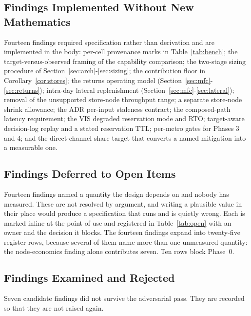 \subsection{Findings Implemented Without New Mathematics}

Fourteen findings required specification rather than derivation and are implemented in the body: per-cell provenance marks in Table~\ref{tab:bench}; the target-versus-observed framing of the capability comparison; the two-stage sizing procedure of Section~\ref{sec:arch}-\ref{sec:sizing}; the contribution floor in Corollary~\ref{cor:stores}; the returns operating model (Section~\ref{sec:mfc}-\ref{sec:returns}); intra-day lateral replenishment (Section~\ref{sec:mfc}-\ref{sec:lateral}); removal of the unsupported store-node throughput range; a separate store-node shrink allowance; the ADR per-input staleness contract; the composed-path latency requirement; the VIS degraded reservation mode and RTO; target-aware decision-log replay and a stated reservation TTL; per-metro gates for Phases 3 and 4; and the direct-channel share target that converts a named mitigation into a measurable one.

\subsection{Findings Deferred to Open Items}

Fourteen findings named a quantity the design depends on and nobody has measured. These are not resolved by argument, and writing a plausible value in their place would produce a specification that runs and is quietly wrong. Each is marked inline at the point of use and registered in Table~\ref{tab:open} with an owner and the decision it blocks. The fourteen findings expand into twenty-five register rows, because several of them name more than one unmeasured quantity: the node-economics finding alone contributes seven. Ten rows block Phase~0.

\subsection{Findings Examined and Rejected}

Seven candidate findings did not survive the adversarial pass. They are recorded so that they are not raised again.

